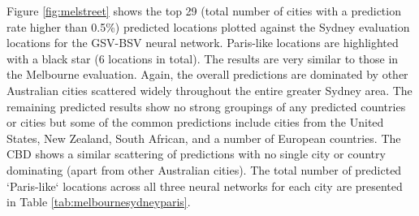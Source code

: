 \documentclass[sageh,times]{sagej}
\begin{document}
Figure \ref{fig:melstreet} shows the top 29 (total number of cities with a prediction rate higher than 0.5\%) predicted locations plotted against the Sydney evaluation locations for the GSV-BSV neural network. Paris-like locations are highlighted with a black star (6 locations in total). The results are very similar to those in the Melbourne evaluation. Again, the overall predictions are dominated by other Australian cities scattered widely throughout the entire greater Sydney area. The remaining predicted results show no strong groupings of any predicted countries or cities but some of the common predictions include cities from the United States, New Zealand, South African, and a number of European countries. The CBD shows a similar scattering of predictions with no single city or country dominating (apart from other Australian cities). The total number of predicted `Paris-like` locations across all three neural networks for each city are presented in Table \ref{tab:melbournesydneyparis}.



\end{document}
